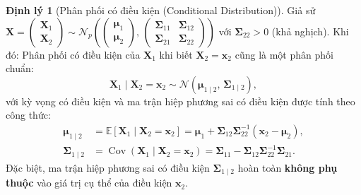 \documentclass[11pt,a4paper]{article}
\theoremstyle{definition}
\newtheorem{thm}{Định lý}
\begin{document}
\begin{thm}[Phân phối có điều kiện (Conditional Distribution)]
Giả sử $\mathbf{X} = \begin{pmatrix} \mathbf{X}_1 \\ \mathbf{X}_2 \end{pmatrix} \sim \mathcal{N}_p\left( \begin{pmatrix} \boldsymbol{\mu}_1 \\ \boldsymbol{\mu}_2 \end{pmatrix}, \, \begin{pmatrix} \boldsymbol{\Sigma}_{11} & \boldsymbol{\Sigma}_{12} \\ \boldsymbol{\Sigma}_{21} & \boldsymbol{\Sigma}_{22} \end{pmatrix} \right)$ với $\boldsymbol{\Sigma}_{22} > 0$ (khả nghịch). Khi đó:
Phân phối có điều kiện của $\mathbf{X}_1$ khi biết $\mathbf{X}_2 = \mathbf{x}_2$ cũng là một phân phối chuẩn:
\[
\mathbf{X}_1 \mid \mathbf{X}_2 = \mathbf{x}_2 \sim \mathcal{N}\left(\boldsymbol{\mu}_{1 \mid 2}, \, \boldsymbol{\Sigma}_{1 \mid 2}\right),
\]
với kỳ vọng có điều kiện và ma trận hiệp phương sai có điều kiện được tính theo công thức:
\begin{align*}
  \boldsymbol{\mu}_{1 \mid 2} &= \mathbb{E}[\mathbf{X}_1 \mid \mathbf{X}_2 = \mathbf{x}_2] = \boldsymbol{\mu}_1 + \boldsymbol{\Sigma}_{12} \boldsymbol{\Sigma}_{22}^{-1} (\mathbf{x}_2 - \boldsymbol{\mu}_2), \\
  \boldsymbol{\Sigma}_{1 \mid 2} &= \operatorname{Cov}(\mathbf{X}_1 \mid \mathbf{X}_2 = \mathbf{x}_2) = \boldsymbol{\Sigma}_{11} - \boldsymbol{\Sigma}_{12} \boldsymbol{\Sigma}_{22}^{-1} \boldsymbol{\Sigma}_{21}.
\end{align*}
Đặc biệt, ma trận hiệp phương sai có điều kiện $\boldsymbol{\Sigma}_{1 \mid 2}$ hoàn toàn \textbf{không phụ thuộc} vào giá trị cụ thể của điều kiện $\mathbf{x}_2$.
\end{thm}
\end{document}
